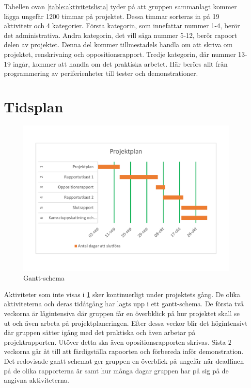 \documentclass[a4paper]{article}
\begin{document}

Tabellen ovan \ref{table:aktivitetslista} tyder på att gruppen sammanlagt kommer lägga ungefär 1200 timmar på projektet. Dessa timmar sorteras in på 19 aktivitetr och 4 kategorier. Första kategorin, som innefattar nummer 1-4, berör det administrativa. Andra kategorin, det vill säga nummer 5-12, berör rapoort delen av projektet. Denna del kommer tillmestadels handla om att skriva om projektet, renskrivning och oppositionsrapport. Tredje kategorin, där nummer 13-19 ingår, kommer att handla om det praktiska arbetet. Här berörs allt från programmering av periferienheter till tester och demonstrationer.


\section{Tidsplan}
\begin{figure}[H]
    \includegraphics[width=\textwidth]{Gantschema.pdf}
    \caption{Gantt-schema}
    \label{figure:gantt}
\end{figure}

Aktiviteter som inte visas i \ref{figure:gantt} sker kontinuerligt under projektets gång. De olika aktiviteterna och deras tidåtgång har lagts upp i ett gantt-schema. De första två veckorna är lågintensiva där gruppen får en överbklick på hur projektet skall se ut och även arbeta på projektplaneringen. Efter dessa veckor blir det högintensivt där gruppen sätter igång med det praktiska och även arbetar på projektrapporten. Utöver detta ska även opositionsrapporten skrivas. Sista 2 veckorna går åt till att färdigställa rapoorten och förbereda inför demonstration. Det redovisade gantt-schemat ger gruppen en överblick på ungefär när deadlinen på de olika rapporterna är samt hur många dagar gruppen har på sig på de angivna aktiviteterna.
\end{document}
